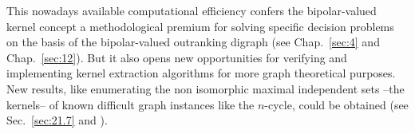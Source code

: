 This nowadays available computational efficiency confers the bipolar-valued kernel concept a methodological premium for solving specific decision problems on the basis of the bipolar-valued outranking digraph (see Chap.~\ref{sec:4} and Chap.~\ref{sec:12}). But it also opens new opportunities for verifying and implementing kernel extraction algorithms for more graph theoretical purposes. New results, like enumerating the non isomorphic maximal independent sets --the kernels-- of known difficult graph instances like the $n$-cycle, could be obtained (see Sec.~\ref{sec:21.7} and \citealp*{ISO-2008}).

%


